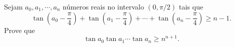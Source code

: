 Sejam $a_0,a_1,\cdots ,a_n$ números reais no intervalo $\left(0,\pi/2\right)$ tais que \[ \tan \left(a_0-\frac{\pi}{4}\right)+ \tan \left(a_1-\frac{\pi}{4}\right)+\cdots +\tan \left(a_n-\frac{\pi}{4}\right)\geq n-1.  \] Prove que \[ \tan a_0\tan a_1 \cdots \tan a_n\geq n^{n+1}.  \]
